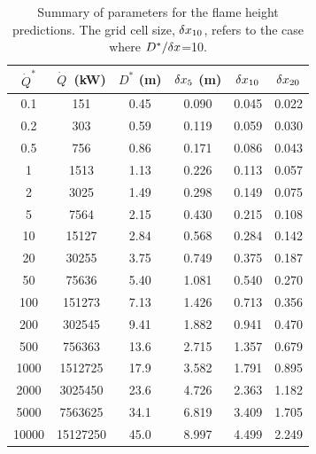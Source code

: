 \clearpage

\begin{table}[h!]
\caption[Summary of parameters for the flame height predictions]{Summary of parameters for the flame height predictions. The grid cell size, $\delta x_{10}$, refers to the case where $D^*/\delta x$=10.}
\begin{center}
\begin{tabular}{|c|c|c|c|c|c|}
\hline
$\dot{Q}^*$       & $\dot{Q}$~(kW) & $D^*$ (m)  & $\delta x_5$ (m)  & $\delta x_{10}$  & $\delta x_{20}$ \\ \hline \hline
0.1         &   151          & 0.45       & 0.090        & 0.045       &  0.022     \\ \hline
0.2         &   303          & 0.59       & 0.119        & 0.059       &  0.030     \\ \hline
0.5         &   756          & 0.86       & 0.171        & 0.086       &  0.043     \\ \hline
1           &   1513         & 1.13       & 0.226        & 0.113       &  0.057     \\ \hline
2           &   3025         & 1.49       & 0.298        & 0.149       &  0.075     \\ \hline
5           &   7564         & 2.15       & 0.430        & 0.215       &  0.108     \\ \hline
10          &   15127        & 2.84       & 0.568        & 0.284       &  0.142     \\ \hline
20          &   30255        & 3.75       & 0.749        & 0.375       &  0.187     \\ \hline
50          &   75636        & 5.40       & 1.081        & 0.540       &  0.270     \\ \hline
100         &   151273       & 7.13       & 1.426        & 0.713       &  0.356     \\ \hline
200         &   302545       & 9.41       & 1.882        & 0.941       &  0.470     \\ \hline
500         &   756363       & 13.6       & 2.715        & 1.357       &  0.679     \\ \hline
1000        &   1512725      & 17.9       & 3.582        & 1.791       &  0.895     \\ \hline
2000        &   3025450      & 23.6       & 4.726        & 2.363       &  1.182     \\ \hline
5000        &   7563625      & 34.1       & 6.819        & 3.409       &  1.705     \\ \hline
10000       &   15127250     & 45.0       & 8.997        & 4.499       &  2.249     \\ \hline
\end{tabular}
\end{center}
\label{Flame_Height_Parameters}
\end{table}

